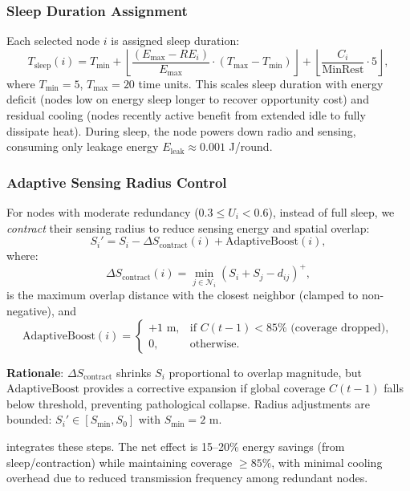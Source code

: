 \subsubsection{Sleep Duration Assignment}
Each selected node $i$ is assigned sleep duration:
\begin{equation}
T_{\text{sleep}}(i) = T_{\min} + \left\lfloor \frac{(E_{\max} - RE_i)}{E_{\max}} \cdot (T_{\max} - T_{\min}) \right\rfloor + \left\lfloor \frac{C_i}{\text{MinRest}} \cdot 5 \right\rfloor,
\label{eq:sleep-duration}
\end{equation}
where $T_{\min}=5$, $T_{\max}=20$ time units. This scales sleep duration with energy deficit (nodes low on energy sleep longer to recover opportunity cost) and residual cooling (nodes recently active benefit from extended idle to fully dissipate heat). During sleep, the node powers down radio and sensing, consuming only leakage energy $E_{\text{leak}} \approx 0.001$ J/round.

\subsubsection{Adaptive Sensing Radius Control}
\label{subsubsec:adaptive-radius}
For nodes with moderate redundancy ($0.3 \le U_i < 0.6$), instead of full sleep, we \emph{contract} their sensing radius to reduce sensing energy and spatial overlap:
\begin{equation}
S_i' = S_i - \Delta S_{\text{contract}}(i) + \mathrm{AdaptiveBoost}(i),
\label{eq:adaptive-radius}
\end{equation}
where:
\begin{equation}
\Delta S_{\text{contract}}(i) = \min_{j \in \mathcal{N}_i} \left( S_i + S_j - d_{ij} \right)^+,
\end{equation}
is the maximum overlap distance with the closest neighbor (clamped to non-negative), and
\begin{equation}
\mathrm{AdaptiveBoost}(i) = \begin{cases}
  +1 \text{ m}, & \text{if } C(t-1) < 85\% \text{ (coverage dropped)}, \\
  0, & \text{otherwise}.
\end{cases}
\label{eq:adaptive-boost}
\end{equation}

\textbf{Rationale}: $\Delta S_{\text{contract}}$ shrinks $S_i$ proportional to overlap magnitude, but $\mathrm{AdaptiveBoost}$ provides a corrective expansion if global coverage $C(t-1)$ falls below threshold, preventing pathological collapse. Radius adjustments are bounded: $S_i' \in [S_{\min}, S_0]$ with $S_{\min}=2$ m.

 integrates these steps. The net effect is 15--20\% energy savings (from sleep/contraction) while maintaining coverage $\ge 85\%$, with minimal cooling overhead due to reduced transmission frequency among redundant nodes.
